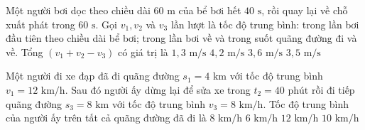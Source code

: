 \begin{vd} Một người bơi dọc theo chiều dài $60\text{ m}$ của bể bơi hết $40\text{ s}$, rồi quay lại về chỗ xuất phát trong $60\text{ s}$. Gọi $v_1, v_2$ và $v_3$ lần lượt là tốc độ trung bình: trong lần bơi đầu tiên theo chiều dài bể bơi; trong lần bơi về và trong suốt quãng đường đi và về. Tổng $(v_1 + v_2 - v_3)$ có giá trị là
\choice
{\True $1{,}3\text{ m/s}$}
{$4{,}2\text{ m/s}$}
{$3{,}6\text{ m/s}$}
{$3{,}5\text{ m/s}$}
\end{vd}

\begin{vd} Một người đi xe đạp đã đi quãng đường $s_1 = 4\text{ km}$ với tốc độ trung bình $v_1 = 12\text{ km/h}$. Sau đó người ấy dừng lại để sửa xe trong $t_2 = 40\text{ phút}$ rồi đi tiếp quãng đường $s_3 = 8\text{ km}$ với tốc độ trung bình $v_3 = 8\text{ km/h}$. Tốc độ trung bình của người ấy trên tất cả quãng đường đã đi là
\choice
{$8\text{ km/h}$}
{\True $6\text{ km/h}$}
{$12\text{ km/h}$}
{$10\text{ km/h}$}
\end{vd}

